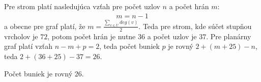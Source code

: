 Pre strom platí nasledujúca vzťah pre počet uzlov $n$ a počet hrán $m$:
\begin{align*}
m = n-1
\end{align*}
a obecne pre graf platí, že $m = \frac{\sum_{v \in U}^{} deg(v)}{2}$.
Teda pre strom, kde súčet stupňou vrcholov je $72$, potom počet hrán je nutne $36$ a počet uzlov je
$37$. 
Pre planárny graf platí vzťah $n - m + p = 2$, teda počet buniek $p$ je rovný $2+(m+25)-n$, teda
$2+(36+25)-37 = 26$.

Počet buniek je rovný $26$.
